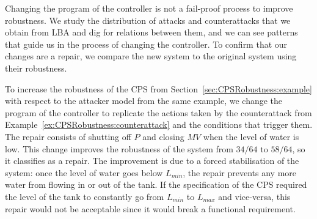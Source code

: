 {{Changing the program of the controller is not a fail-proof process to improve robustness. We study the distribution of attacks and counterattacks that we obtain from LBA and dig for relations between them, and we can see patterns that guide us in the process of changing the controller. To confirm that our changes are a repair, we compare the new system to the original system using  their robustness.

\begin{example}
  To increase the robustness of the CPS from Section~\ref{sec:CPSRobustness:example} with respect to the attacker model from the same example, we change the program of the controller to replicate the actions taken by the counterattack from Example~\ref{ex:CPSRobustness:counterattack} and the conditions that trigger them. The repair consists of shutting off $P$ and closing $MV$ when the level of water is low. This change improves the robustness of the system from $34/64$ to $58/64$, so it classifies as a repair. The improvement is due to a forced stabilisation of the system: once the level of water goes below $L_{min}$, the repair prevents any more water from flowing in or out of the tank. If the specification of the CPS required the level of the tank to constantly go from $L_{min}$ to $L_{max}$ and vice-versa, this repair would not be acceptable since it would break a functional requirement.
  

\end{example}}}
